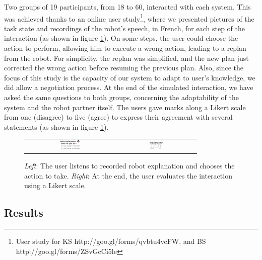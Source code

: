 Two groups of 19 participants, from 18 to 60, interacted with each system. This was achieved thanks to  
an online user study\footnote{User study for KS http://goo.gl/forms/qvbtu4vcFW, and BS http://goo.gl/forms/ZSvGcCi5le}, where we presented pictures of the task state and recordings of the robot's speech, in French, for each step of the interaction (as shown in figure \ref{fig:plan_management-user_study}).
On some steps, the user could choose the action to perform, allowing him to execute a wrong action, leading to a replan from the robot. For simplicity, the replan was simplified, and the new plan just corrected the wrong action before resuming the previous plan. Also, since the focus of this study is the capacity of our system to adapt to user's knowledge, we did allow a negotiation process.
At the end of the simulated interaction, we have asked the same questions to both groups, concerning the adaptability of the system and the robot partner itself. 
The users gave marks along a Likert scale from one (disagree) to five (agree) to express their agreement with several statements (as shown in figure \ref{fig:plan_management-user_study}).

\begin{figure}[ht!]
 \centering
 \begin{tabular}{cc}
  \includegraphics[width=0.24\textwidth]{img/plan_management/ustudy9.png} &
  \includegraphics[width=0.19\textwidth]{img/plan_management/ustudy11.png}
 \end{tabular}
 \caption{\textit{Left}: The user listens to recorded robot explanation and chooses the action to take. \textit{Right}: At the end, the user evaluates the interaction using a Likert scale.}
 \label{fig:plan_management-user_study}
 \end{figure}

\subsection{Results}

